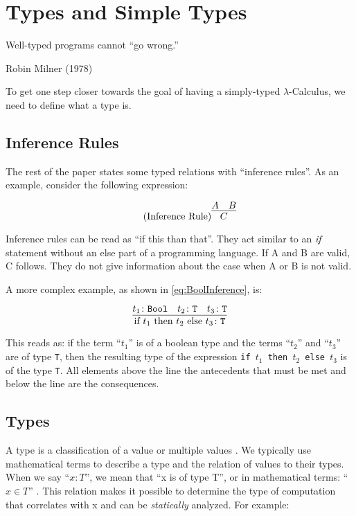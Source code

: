 \section{Types and Simple Types}
\label{sec:types}

\epigraph{Well-typed programs cannot ``go wrong.''}{Robin Milner (1978)}

To get one step closer towards the goal of having a
simply-typed $\lambda$-Calculus, we need to define
what a type is.

\subsection{Inference Rules}

The rest of the paper states some typed relations with
``inference rules''. As an example, consider the following
expression:

\begin{equation*}
    \tag{Inference Rule}
    \infer{
        C
    }{
        A & B
    }
\end{equation*}

Inference rules can be read as ``if this than that''. They act
similar to an \textit{if} statement without an else part of a programming language.
If A and B are valid, C follows. They do not give information about the
case when A or B is not valid.

A more complex example, as shown in \cref{eq:BoolInference}, is:

\begin{equation*}
    \infer{
        \text{if } t_1 \text{ then } t_2 \text{ else } t_3 \colon \texttt{T}
    }{
        t_1 \colon \texttt{Bool} & t_2 \colon \texttt{T} & t_3 \colon \texttt{T}
    }
\end{equation*}

This reads as: if the term ``$t_1$'' is of a boolean type and the terms ``$t_2$''
and ``$t_3$'' are of type \texttt{T},
then the resulting type of the expression \texttt{if $t_1$ then $t_2$ else $t_3$} is
of the type \texttt{T}. All elements above the line the antecedents that must be met
and below the line are the consequences.

\subsection{Types}

A type is a classification of a value or multiple values \cite{pierce2002ProgLang}.
We typically use mathematical terms to describe a type and the relation
of values to their types. When we say ``$x : T$'', we mean that
``x is of type T'', or in mathematical terms: ``$x \in T$'' \cite{pierce2002ProgLang}.
This relation makes it possible to determine the type of computation
that correlates with x and can be \textit{statically} analyzed.
For example:

